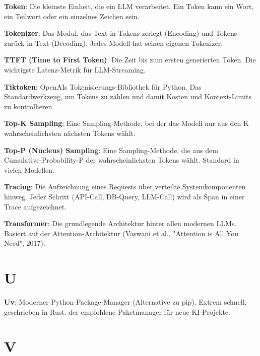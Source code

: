 \textbf{Token}\hspace{0pt}: Die kleinste Einheit, die ein LLM verarbeitet. Ein Token kann ein Wort, ein Teilwort oder ein einzelnes Zeichen sein.

\textbf{Tokenizer}\hspace{0pt}: Das Modul, das Text in Tokens zerlegt (Encoding) und Tokens zurück in Text (Decoding). Jedes Modell hat seinen eigenen Tokenizer.

\textbf{TTFT (Time to First Token)}\hspace{0pt}: Die Zeit bis zum ersten generierten Token. Die wichtigste Latenz-Metrik für LLM-Streaming.

\textbf{Tiktoken}\hspace{0pt}: OpenAIs Tokenisierungs-Bibliothek für Python. Das Standardwerkzeug, um Tokens zu zählen und damit Kosten und Kontext-Limits zu kontrollieren.

\textbf{Top-K Sampling}\hspace{0pt}: Eine Sampling-Methode, bei der das Modell nur aus den K wahrscheinlichsten nächsten Tokens wählt.

\textbf{Top-P (Nucleus) Sampling}\hspace{0pt}: Eine Sampling-Methode, die aus dem Cumulative-Probability-P der wahrscheinlichsten Tokens wählt. Standard in vielen Modellen.

\textbf{Tracing}\hspace{0pt}: Die Aufzeichnung eines Requests über verteilte Systemkomponenten hinweg. Jeder Schritt (API-Call, DB-Query, LLM-Call) wird als Span in einer Trace aufgezeichnet.

\textbf{Transformer}\hspace{0pt}: Die grundlegende Architektur hinter allen modernen LLMs. Basiert auf der Attention-Architektur (Vaswani et al., "Attention is All You Need", 2017).

\section{U}

\textbf{Uv}\hspace{0pt}: Moderner Python-Package-Manager (Alternative zu pip). Extrem schnell, geschrieben in Rust. der empfohlene Paketmanager für neue KI-Projekte.

\section{V}

